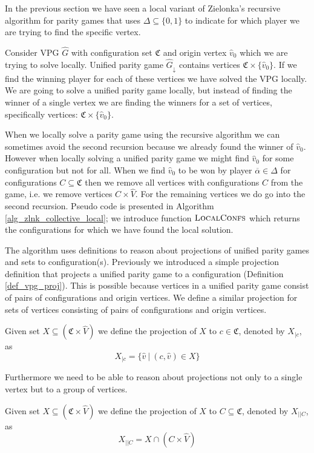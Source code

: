 In the previous section we have seen a local variant of Zielonka's recursive algorithm for parity games that uses $\Delta \subseteq \{0,1\}$ to indicate for which player we are trying to find the specific vertex.

Consider VPG $\hat{G}$ with configuration set $\mathfrak{C}$ and origin vertex $\hat{v}_0$ which we are trying to solve locally. Unified parity game $\hat{G}_{\downarrow}$ contains vertices $\mathfrak{C} \times \{\hat{v}_0\}$. If we find the winning player for each of these vertices we have solved the VPG locally. We are going to solve a unified parity game locally, but instead of finding the winner of a single vertex we are finding the winners for a set of vertices, specifically vertices: $\mathfrak{C} \times \{\hat{v}_0\}$.

When we locally solve a parity game using the recursive algorithm we can sometimes avoid the second recursion because we already found the winner of $\hat{v}_0$. However when locally solving a unified parity game we might find $\hat{v}_0$ for some configuration but not for all. When we find $\hat{v}_0$ to be won by player $\overline{\alpha} \in \Delta$ for configurations $C \subseteq \mathfrak{C}$ then we remove all vertices with configurations $C$ from the game, i.e. we remove vertices $C \times \hat{V}$. For the remaining vertices we do go into the second recursion. Pseudo code is presented in Algorithm \ref{alg_zlnk_collective_local}; we introduce function $\textsc{LocalConfs}$ which returns the configurations for which we have found the local solution.

The algorithm uses definitions to reason about projections of unified parity games and sets to configuration(s). Previously we introduced a simple projection definition that projects a unified parity game to a configuration (Definition \ref{def_vpg_proj}). This is possible because vertices in a unified parity game consist of pairs of configurations and origin vertices. We define a similar projection for sets of vertices consisting of pairs of configurations and origin vertices.
\begin{definition}
	Given set $X \subseteq (\mathfrak{C} \times \hat{V})$ we define the projection of $X$ to $c \in \mathfrak{C}$, denoted by $X_{|c}$, as
	\[ X_{|c} = \{ \hat{v}\ |\ (c,\hat{v}) \in X \} \]
\end{definition}
Furthermore we need to be able to reason about projections not only to a single vertex but to a group of vertices. 
\begin{definition}
	Given set $X \subseteq (\mathfrak{C} \times \hat{V})$ we define the projection of $X$ to $C \subseteq \mathfrak{C}$, denoted by $X_{||C}$, as
	\[ X_{||C} = X \cap (C \times \hat{V}) \]
\end{definition}

